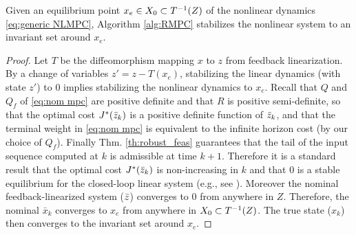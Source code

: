 
\begin{theorem}[Stability]
	\label{thm:stability}
Given an equilibrium point $x_e \in X_0 \subset T^{-1}(Z)$ of the nonlinear dynamics \eqref{eq:generic NLMPC}, Algorithm \ref{alg:RMPC} stabilizes the nonlinear system to an invariant set around $x_e$.
\end{theorem}

\begin{proof}
Let $T$ be the diffeomorphism mapping $x$ to $z$ from feedback linearization.
By a change of variables $z' = z - T(x_e)$, stabilizing the linear dynamics (with state $z'$) to 0 implies stabilizing the nonlinear dynamics to $x_e$.
Recall that $Q$ and $Q_f$ of  \eqref{eq:nom mpc} are positive definite and that $R$ is positive semi-definite,  so that the optimal cost $J^*(\bar{z}_{k})$ is a positive definite function of $\bar{z}_{k}$, and that the terminal weight in \eqref{eq:nom mpc} is equivalent to the infinite horizon cost (by our choice of $Q_f$). 
Finally Thm.  \ref{th:robust_feas} guarantees that the tail of the input sequence computed at $k$ is admissible at time $k+1$. 
Therefore it is a standard result that the optimal cost $J^{*}({\bar{z}}_{k})$ is non-increasing in $k$ and that $0$ is a stable equilibrium for the closed-loop linear system (e.g., see \cite{CannonK15MPC} ). 
Moreover the nominal feedback-linearized system ($\bar{z}$) converges to 0 from anywhere in $Z$. Therefore, the nominal $\bar{x}_{k}$ converges to $x_e$ from anywhere in $X_0 \subset T^{-1}(Z)$. The true state ($x_k$) then converges to the invariant set around $x_e$.
\end{proof}
